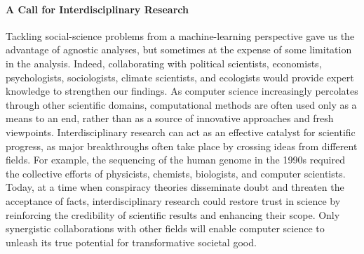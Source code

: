 \paragraph{A Call for Interdisciplinary Research}

Tackling social-science problems from a machine-learning perspective gave us the advantage of agnostic analyses, but sometimes at the expense of some limitation in the analysis.
Indeed, collaborating with political scientists, economists, psychologists, sociologists, climate scientists, and ecologists would provide expert knowledge to strengthen our findings.
As computer science increasingly percolates through other scientific domains, computational methods are often used only as a means to an end, rather than as a source of innovative approaches and fresh viewpoints.
Interdisciplinary research can act as an effective catalyst for scientific progress, as major breakthroughs often take place by crossing ideas from different fields.
For example, the sequencing of the human genome in the 1990s required the collective efforts of physicists, chemists, biologists, and computer scientists.
Today, at a time when conspiracy theories disseminate doubt and threaten the acceptance of facts, interdisciplinary research could restore trust in science by reinforcing the credibility of scientific results and enhancing their scope.
Only synergistic collaborations with other fields will enable computer science to unleash its true potential for transformative societal good.
